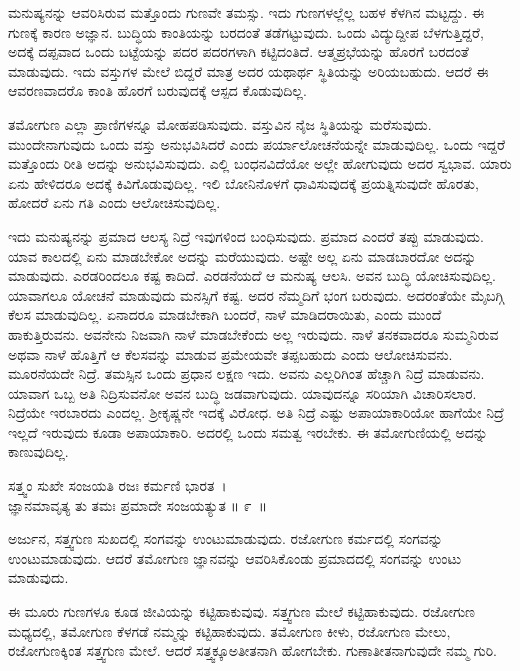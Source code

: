 ಮನುಷ್ಯನನ್ನು ಆವರಿಸಿರುವ ಮತ್ತೊಂದು ಗುಣವೇ ತಮಸ್ಸು. ಇದು ಗುಣಗಳಲ್ಲೆಲ್ಲ ಬಹಳ ಕೆಳಗಿನ ಮಟ್ಟದ್ದು. ಈ ಗುಣಕ್ಕೆ ಕಾರಣ ಅಜ್ಞಾನ. ಬುದ್ಧಿಯ ಕಾಂತಿಯನ್ನು ಬರದಂತೆ ತಡೆಗಟ್ಟುವುದು. ಒಂದು ವಿದ್ಯುದ್ದೀಪ ಬೆಳಗುತ್ತಿದ್ದರೆ, ಅದಕ್ಕೆ ದಪ್ಪವಾದ ಒಂದು ಬಟ್ಟೆಯನ್ನು ಪದರ ಪದರಗಳಾಗಿ ಕಟ್ಟಿದಂತಿದೆ. ಆತ್ಮಪ್ರಭೆಯನ್ನು ಹೊರಗೆ ಬರದಂತೆ ಮಾಡುವುದು. ಇದು ವಸ್ತುಗಳ ಮೇಲೆ ಬಿದ್ದರೆ ಮಾತ್ರ ಅದರ ಯಥಾರ್ಥ ಸ್ಥಿತಿಯನ್ನು ಅರಿಯಬಹುದು. ಆದರೆ ಈ ಆವರಣವಾದರೊ ಕಾಂತಿ ಹೊರಗೆ ಬರುವುದಕ್ಕೆ ಆಸ್ಪದ ಕೊಡುವುದಿಲ್ಲ.

ತಮೋಗುಣ ಎಲ್ಲಾ ಪ್ರಾಣಿಗಳನ್ನೂ ಮೋಹಪಡಿಸುವುದು. ವಸ್ತುವಿನ ನೈಜ ಸ್ಥಿತಿಯನ್ನು ಮರೆಸುವುದು. ಮುಂದೇನಾಗುವುದು ಒಂದು ವಸ್ತು ಅನುಭವಿಸಿದರೆ ಎಂದು ಪರ್ಯಾಲೋಚನೆ\-ಯನ್ನೇ ಮಾಡುವುದಿಲ್ಲ. ಒಂದು ಇದ್ದರೆ ಮತ್ತೊಂದು ರೀತಿ ಅದನ್ನು ಅನುಭವಿಸುವುದು. ಎಲ್ಲಿ ಬಂಧನವಿದೆಯೋ ಅಲ್ಲೇ ಹೋಗುವುದು ಅದರ ಸ್ವಭಾವ. ಯಾರು ಏನು ಹೇಳಿದರೂ ಅದಕ್ಕೆ ಕಿವಿಗೊಡುವುದಿಲ್ಲ. ಇಲಿ ಬೋನಿನೊಳಗೆ ಧಾವಿಸುವುದಕ್ಕೆ ಪ್ರಯತ್ನಿಸುವುದೇ ಹೊರತು, ಹೋದರೆ ಏನು ಗತಿ ಎಂದು ಆಲೋಚಿಸುವುದಿಲ್ಲ.

ಇದು ಮನುಷ್ಯನನ್ನು ಪ್ರಮಾದ ಆಲಸ್ಯ ನಿದ್ರೆ ಇವುಗಳಿಂದ ಬಂಧಿಸುವುದು. ಪ್ರಮಾದ ಎಂದರೆ ತಪ್ಪು ಮಾಡುವುದು. ಯಾವ ಕಾಲದಲ್ಲಿ ಏನು ಮಾಡಬೇಕೋ ಅದನ್ನು ಮರೆಯುವುದು. ಅಷ್ಟೇ ಅಲ್ಲ ಏನು ಮಾಡಬಾರದೋ ಅದನ್ನು ಮಾಡುವುದು. ಎರಡರಿಂದಲೂ ಕಷ್ಟ ಕಾದಿದೆ. ಎರಡನೆಯದೆ ಆ ಮನುಷ್ಯ ಆಲಸಿ. ಅವನ ಬುದ್ಧಿ ಯೋಚಿಸುವುದಿಲ್ಲ. ಯಾವಾಗಲೂ ಯೋಚನೆ ಮಾಡುವುದು ಮನಸ್ಸಿಗೆ ಕಷ್ಟ. ಅದರ ನೆಮ್ಮದಿಗೆ ಭಂಗ ಬರುವುದು. ಅದರಂತೆಯೇ ಮೈಬಗ್ಗಿ ಕೆಲಸ ಮಾಡುವುದಿಲ್ಲ. ಏನಾದರೂ ಮಾಡಬೇಕಾಗಿ ಬಂದರೆ, ನಾಳೆ ಮಾಡಿದರಾಯಿತು, ಎಂದು ಮುಂದೆ ಹಾಕುತ್ತಿರುವನು. ಅವನೇನು ನಿಜವಾಗಿ ನಾಳೆ ಮಾಡಬೇಕೆಂದು ಅಲ್ಲ ಇರುವುದು. ನಾಳೆ ತನಕವಾದರೂ ಸುಮ್ಮನಿರುವ ಅಥವಾ ನಾಳೆ ಹೊತ್ತಿಗೆ ಆ ಕೆಲಸವನ್ನು ಮಾಡುವ ಪ್ರಮೇಯವೇ ತಪ್ಪಬಹುದು ಎಂದು ಆಲೋಚಿಸುವನು. ಮೂರನೆಯದೇ ನಿದ್ರೆ. ತಮಸ್ಸಿನ ಒಂದು ಪ್ರಧಾನ ಲಕ್ಷಣ ಇದು. ಅವನು ಎಲ್ಲರಿಗಿಂತ ಹೆಚ್ಚಾಗಿ ನಿದ್ರೆ ಮಾಡುವನು. ಯಾವಾಗ ಒಬ್ಬ ಅತಿ ನಿದ್ರಿಸುವನೋ ಅವನ ಬುದ್ಧಿ ಜಡವಾಗುವುದು. ಯಾವುದನ್ನೂ ಸರಿಯಾಗಿ ವಿಚಾರಿಸಲಾರ. ನಿದ್ರೆಯೇ ಇರಬಾರದು ಎಂದಲ್ಲ. ಶ‍್ರೀಕೃಷ್ಣನೇ ಇದಕ್ಕೆ ವಿರೋಧ. ಅತಿ ನಿದ್ರೆ ಎಷ್ಟು ಅಪಾಯಾಕಾರಿಯೋ ಹಾಗೆಯೇ ನಿದ್ರೆ ಇಲ್ಲದೆ ಇರುವುದು ಕೂಡಾ ಅಪಾಯಾಕಾರಿ. ಅದರಲ್ಲಿ ಒಂದು ಸಮತ್ವ ಇರಬೇಕು. ಈ ತಮೋಗುಣಿಯಲ್ಲಿ ಅದನ್ನು ಕಾಣುವುದಿಲ್ಲ.

\begin{shloka}
ಸತ್ತ್ವಂ ಸುಖೇ ಸಂಜಯತಿ ರಜಃ ಕರ್ಮಣಿ ಭಾರತ~।\\ಜ್ಞಾನಮಾವೃತ್ಯ ತು ತಮಃ ಪ್ರಮಾದೇ ಸಂಜಯತ್ಯುತ \hfill॥ ೯~॥
\end{shloka}

\begin{artha}
ಅರ್ಜುನ, ಸತ್ತ್ವಗುಣ ಸುಖದಲ್ಲಿ ಸಂಗವನ್ನು ಉಂಟುಮಾಡುವುದು. ರಜೋಗುಣ ಕರ್ಮದಲ್ಲಿ ಸಂಗವನ್ನು ಉಂಟುಮಾಡುವುದು. ಆದರೆ ತಮೋಗುಣ ಜ್ಞಾನವನ್ನು ಆವರಿಸಿಕೊಂಡು ಪ್ರಮಾದದಲ್ಲಿ ಸಂಗವನ್ನು ಉಂಟು ಮಾಡುವುದು.
\end{artha}

ಈ ಮೂರು ಗುಣಗಳೂ ಕೂಡ ಜೀವಿಯನ್ನು ಕಟ್ಟಿಹಾಕುವುವು. ಸತ್ತ್ವಗುಣ ಮೇಲೆ ಕಟ್ಟಿಹಾಕುವುದು. ರಜೋಗುಣ ಮಧ್ಯದಲ್ಲಿ, ತಮೋಗುಣ ಕೆಳಗಡೆ ನಮ್ಮನ್ನು ಕಟ್ಟಿಹಾಕುವುದು. ತಮೋಗುಣ ಕೀಳು, ರಜೋಗುಣ ಮೇಲು, ರಜೋಗುಣಕ್ಕಿಂತ ಸತ್ತ್ವಗುಣ ಮೇಲೆ. ಆದರೆ ಸತ್ತ್ವಕ್ಕೂ\break ಅತೀತನಾಗಿ ಹೋಗಬೇಕು. ಗುಣಾತೀತನಾಗುವುದೇ ನಮ್ಮ ಗುರಿ.

